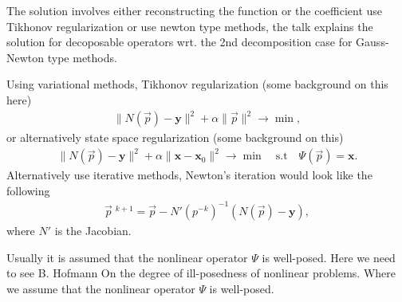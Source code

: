 The solution involves either reconstructing the function or the coefficient use
Tikhonov regularization or use newton type methods, the talk explains the
solution for decoposable operators wrt. the 2nd decomposition case for
Gauss-Newton type methods.

Using variational methods, Tikhonov regularization (some background on this
here)
\begin{align}
    \|N(\vec{p}) - \mathbf{y}\|^{2} + \alpha \|\vec{p}\|^{2} \to \min,
\end{align}
or alternatively state space regularization (some background on this)
\begin{align}
    \|N(\vec{p}) - \mathbf{y}\|^{2}
    + \alpha \|\mathbf{x} - \mathbf{x}_0\|^{2}
    \to \min \quad \text{s.t} \quad \Psi(\vec{p}) = \mathbf{x}.
\end{align}
Alternatively use iterative methods, Newton's iteration would look like the
following
\begin{align}
    \vec{p}\;^{k+1} = \vec{p} - N'\left(p^{-k}\right)^{-1}\left(N(\vec{p}) -
    \mathbf{y}  \right),
\end{align}
where $N'$ is the Jacobian.

Usually it is assumed that the nonlinear operator $\Psi$ is well-posed.
Here we need to see B. Hofmann On the degree of ill-posedness of nonlinear
problems. Where we assume that the nonlinear operator $\Psi$ is well-posed.


